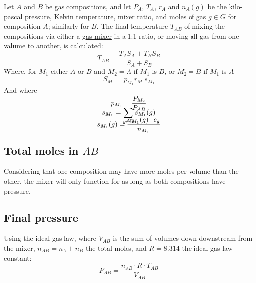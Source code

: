 \documentclass{article}
\begin{document}
Let $A$ and $B$ be gas compositions, and let $P_A$, $T_A$, $r_A$ and $n_A(g)$ be
the kilo-pascal pressure, Kelvin temperature, mixer ratio, and moles of gas
$g\in G$ for composition $A$; similarly for $B$.
The final temperature $T_{AB}$ of mixing the compositions via either a
\href{https://stationeers-wiki.com/Pipe_Gas_Mixer}{gas mixer}
in a 1:1 ratio, or moving all gas from one valume to another, is calculated:
\begin{equation}\label{eq:T_AB}
    T_{AB}
    = \frac{T_A S_A+T_B S_B}{S_A+S_B}
\end{equation}
Where, for $M_1$ either $A$ or $B$ and
$M_2=A$ if $M_1$ is $B$, or
$M_2=B$ if $M_1$ is $A$
\begin{equation}\label{eq:S_M1}
    S_{M_1} = p_{M_1}r_{M_1}s_{M_1}
\end{equation}
And where
\vspace{-1em}
\begin{multicols}{3}
    \noindent
    \begin{equation}\label{eq:p_M1}
        p_{M_1} = \smash{\frac{P_{M_2}}{P_{AB}}}
    \end{equation}
    \begin{equation}\label{eq:s_M1}
        s_{M_1} = \smash{\sum_{g\in G}s_{M_1}(g)}
    \end{equation}
    \begin{equation}\label{eq:s_M1g}
        s_{M_1}(g) = \smash{\frac{n_{M_1}(g)\cdot c_g}{n_{M_1}}}
    \end{equation}
\end{multicols}

\subsection{Total moles in $AB$}

Considering that one composition may have more moles per volume than the other,
the mixer will only function for as long as both compositions have pressure.

\subsection{Final pressure}

Using the ideal gas law,
where $V_{AB}$ is the sum of volumes down downstream from the mixer,
$n_{AB}=n_A+n_B$ the total moles,
and $R\doteq 8.314$ the ideal gas law constant:
\begin{equation}\label{eq:P_AB}
    P_{AB} = \frac{n_{AB}\cdot R\cdot T_{AB}}{V_{AB}}
\end{equation}

\end{document}
